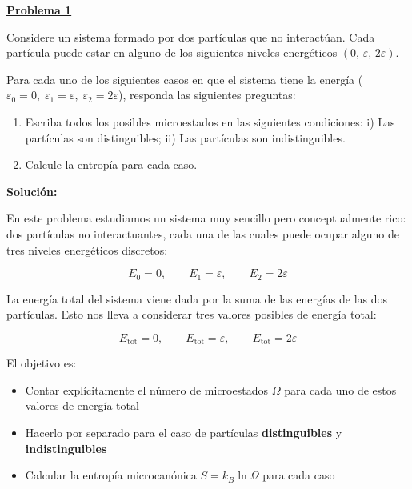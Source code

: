 \documentclass{article}
\newenvironment{AGbox}[1][7]%
{%
  \begin{tcolorbox}[
    enhanced, breakable,
    colframe=AppleGreen,
    colback=AppleGreen!#1,
    boxrule=1pt,
    borderline west={2mm}{-10mm}{AppleGreen},
    sharp corners=southwest,
    left=14pt,right=14pt,top=10pt,bottom=10pt,
     boxsep=6pt,
  ]%
}{%
  \end{tcolorbox}%
}
\begin{document}


\begin{AGbox}[8]
\textcolor{Apple Green}{\textbf{\underline{Problema 1}}} \vspace{2mm}

Considere un sistema formado por dos partículas que no interactúan.  
Cada partícula puede estar en alguno de los siguientes niveles energéticos  
\( (0,\, \varepsilon,\, 2\varepsilon) \).  

Para cada uno de los siguientes casos en que el sistema tiene la energía  
(\(\varepsilon_{0} = 0,\; \varepsilon_{1} = \varepsilon,\; \varepsilon_{2} = 2\varepsilon\)),  
responda las siguientes preguntas:

\begin{enumerate}
  \item Escriba todos los posibles microestados en las siguientes condiciones:  
  \quad i) Las partículas son distinguibles;  
  \quad ii) Las partículas son indistinguibles.
  \item Calcule la entropía para cada caso.  
\end{enumerate}

\end{AGbox}
\vspace{0.5cm}

\textcolor{Tuscany}{\textbf{Solución:}}

En este problema estudiamos un sistema muy sencillo pero conceptualmente rico:
dos partículas no interactuantes, cada una de las cuales puede ocupar alguno
de tres niveles energéticos discretos:

\[
E_{0} = 0,\qquad E_{1} = \varepsilon,\qquad E_{2} = 2\varepsilon
\]

La energía total del sistema viene dada por la suma de las energías de las
dos partículas. Esto nos lleva a considerar tres valores posibles de energía total:

\[
E_{\mathrm{tot}} = 0,\qquad E_{\mathrm{tot}} = \varepsilon,\qquad E_{\mathrm{tot}} = 2\varepsilon
\]

El objetivo es:

\begin{itemize}
  \item Contar explícitamente el número de microestados \(\Omega\) para cada uno de estos
        valores de energía total
  \item Hacerlo por separado para el caso de partículas \textbf{distinguibles} y
        \textbf{indistinguibles}
  \item Calcular la entropía microcanónica \(S = k_{B}\ln\Omega\) para cada caso
\end{itemize}
\end{document}
